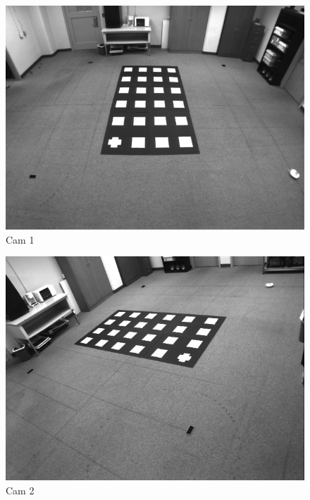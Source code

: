 \documentclass{article}
\begin{document}
\begin{enumerate}
\newpage
\begin{figure}[!htb]
    \centering
  		\includegraphics[scale=0.6]{CalImage_1.png}
  		\caption{Cam 1}
  		\label{Fig2}
 \end{figure}

\begin{figure}[!htb]
    \centering
  		\includegraphics[scale=0.6]{CalImage_2.png}
  		\caption{Cam 2}
  		\label{Fig3}
 \end{figure}


\end{enumerate}
\end{document}
